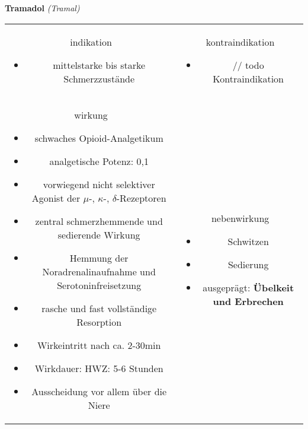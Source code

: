 \begin{frame}{
    \textbf{Tramadol}
    \textit{(Tramal)}
}
    \begin{tabular}{c c}
        \begin{beamercolorbox}[wd=\boxwidth\textwidth,ht=\boxheight\textheight,sep=1em]{indikation}
            \begin{itemize}
                \item mittelstarke bis starke Schmerzzustände
            \end{itemize}
        \end{beamercolorbox} & 
        \begin{beamercolorbox}[wd=\boxwidth\textwidth,ht=\boxheight\textheight,sep=1em]{kontraindikation}
            \begin{itemize}
                \item // todo Kontraindikation 
            \end{itemize}
        \end{beamercolorbox} \\
        \begin{beamercolorbox}[wd=\boxwidth\textwidth,ht=\boxheight\textheight,sep=1em]{wirkung}
            \begin{itemize}
                \item schwaches Opioid-Analgetikum
                \item analgetische Potenz: 0,1
                \item vorwiegend nicht selektiver Agonist der $\mu$-, $\kappa$-, $\delta$-Rezeptoren
                \item zentral schmerzhemmende und sedierende Wirkung
                \item Hemmung der Noradrenalinaufnahme und Serotoninfreisetzung
                \item rasche und fast vollständige Resorption
                \item Wirkeintritt nach ca. 2-30min
                \item Wirkdauer: HWZ: 5-6 Stunden
                \item Ausscheidung vor allem über die Niere
            \end{itemize}
        \end{beamercolorbox} & 
        \begin{beamercolorbox}[wd=\boxwidth\textwidth,ht=\boxheight\textheight,sep=1em]{nebenwirkung}
            \begin{itemize}
                \item Schwitzen
                \item Sedierung
                \item ausgeprägt: \textbf{Übelkeit und Erbrechen}
            \end{itemize}
        \end{beamercolorbox} \\
    \end{tabular}
\end{frame}

